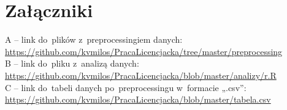 \documentclass[licencjacka]{pracamgr_Kogni}
\begin{document}
\chapter*{Załączniki}

A -- link do~plików z~preprocessingiem danych: \url{https://github.com/kvmilos/PracaLicencjacka/tree/master/preprocessing} \\
B -- link do~pliku z~analizą danych: \url{https://github.com/kvmilos/PracaLicencjacka/blob/master/analizy/r.R} \\
C -- link do~tabeli danych po~preprocessingu w~formacie „.csv”: \url{https://github.com/kvmilos/PracaLicencjacka/blob/master/tabela.csv}
\end{document}
